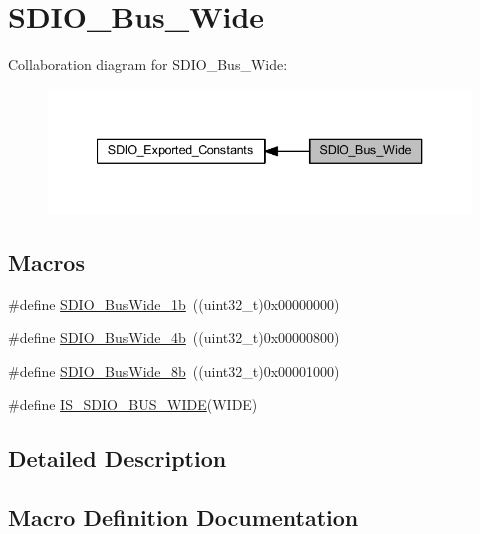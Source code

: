 \hypertarget{group___s_d_i_o___bus___wide}{}\section{S\+D\+I\+O\+\_\+\+Bus\+\_\+\+Wide}
\label{group___s_d_i_o___bus___wide}
Collaboration diagram for S\+D\+I\+O\+\_\+\+Bus\+\_\+\+Wide\+:
\nopagebreak
\begin{figure}[H]
\begin{center}
\leavevmode
\includegraphics[width=340pt]{group___s_d_i_o___bus___wide}
\end{center}
\end{figure}
\subsection*{Macros}
\begin{DoxyCompactItemize}
\item 
\#define \hyperlink{group___s_d_i_o___bus___wide_ga9c333b57937c5cc0a173a58519f9250a}{S\+D\+I\+O\+\_\+\+Bus\+Wide\+\_\+1b}~((uint32\+\_\+t)0x00000000)
\item 
\#define \hyperlink{group___s_d_i_o___bus___wide_ga79815d1d798b28a2d3750ad25466ff1b}{S\+D\+I\+O\+\_\+\+Bus\+Wide\+\_\+4b}~((uint32\+\_\+t)0x00000800)
\item 
\#define \hyperlink{group___s_d_i_o___bus___wide_ga4d864f5c4e1af298146afc1d680081e9}{S\+D\+I\+O\+\_\+\+Bus\+Wide\+\_\+8b}~((uint32\+\_\+t)0x00001000)
\item 
\#define \hyperlink{group___s_d_i_o___bus___wide_gaa5c6ad922117d5df3213631bf68fde5b}{I\+S\+\_\+\+S\+D\+I\+O\+\_\+\+B\+U\+S\+\_\+\+W\+I\+DE}(W\+I\+DE)
\end{DoxyCompactItemize}


\subsection{Detailed Description}


\subsection{Macro Definition Documentation}
\mbox{\label{group___s_d_i_o___bus___wide_gaa5c6ad922117d5df3213631bf68fde5b}} 
